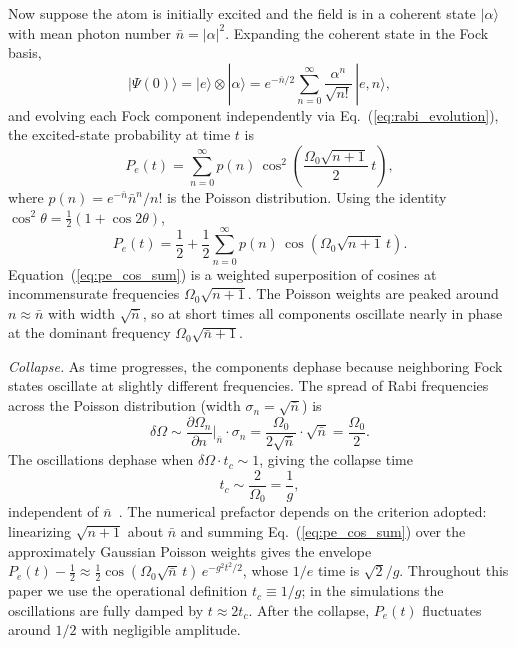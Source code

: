 \documentclass{iopjournal}
\begin{document}
Now suppose the atom is initially excited and the field is in a coherent state $|\alpha\rangle$ with mean photon number $\bar{n} = |\alpha|^2$. Expanding the coherent state in the Fock basis,
\begin{equation}
|\Psi(0)\rangle = |e\rangle \otimes |\alpha\rangle = e^{-\bar{n}/2}\sum_{n=0}^{\infty} \frac{\alpha^n}{\sqrt{n!}}\,|e, n\rangle,
\end{equation}
and evolving each Fock component independently via Eq.~(\ref{eq:rabi_evolution}), the excited-state probability at time $t$ is
\begin{equation}
P_e(t) = \sum_{n=0}^{\infty} p(n)\,\cos^2\!\left(\frac{\Omega_0\sqrt{n+1}}{2}\,t\right),
\label{eq:pe_coherent}
\end{equation}
where $p(n) = e^{-\bar{n}}\bar{n}^n/n!$ is the Poisson distribution. Using the identity $\cos^2\theta = \tfrac{1}{2}(1 + \cos 2\theta)$,
\begin{equation}
P_e(t) = \frac{1}{2} + \frac{1}{2}\sum_{n=0}^{\infty} p(n)\,\cos\!\left(\Omega_0\sqrt{n+1}\,t\right).
\label{eq:pe_cos_sum}
\end{equation}
Equation~(\ref{eq:pe_cos_sum}) is a weighted superposition of cosines at incommensurate frequencies $\Omega_0\sqrt{n+1}$. The Poisson weights are peaked around $n \approx \bar{n}$ with width $\sqrt{\bar{n}}$, so at short times all components oscillate nearly in phase at the dominant frequency $\Omega_0\sqrt{\bar{n}+1}$.

\textit{Collapse.} As time progresses, the components dephase because neighboring Fock states oscillate at slightly different frequencies. The spread of Rabi frequencies across the Poisson distribution (width $\sigma_n = \sqrt{\bar{n}}$) is
\begin{equation}
\delta\Omega \sim \frac{\partial\Omega_n}{\partial n}\bigg|_{\bar{n}} \cdot \sigma_n = \frac{\Omega_0}{2\sqrt{\bar{n}}} \cdot \sqrt{\bar{n}} = \frac{\Omega_0}{2}.
\end{equation}
The oscillations dephase when $\delta\Omega \cdot t_c \sim 1$, giving the collapse time
\begin{equation}
t_c \sim \frac{2}{\Omega_0} = \frac{1}{g},
\label{eq:t_collapse}
\end{equation}
independent of $\bar{n}$~\cite{eberly1980}. The numerical prefactor depends on the criterion adopted: linearizing $\sqrt{n+1}$ about $\bar{n}$ and summing Eq.~(\ref{eq:pe_cos_sum}) over the approximately Gaussian Poisson weights gives the envelope $P_e(t) - \tfrac{1}{2} \approx \tfrac{1}{2}\cos(\Omega_0\sqrt{\bar{n}}\,t)\,e^{-g^2t^2/2}$, whose $1/e$ time is $\sqrt{2}/g$. Throughout this paper we use the operational definition $t_c \equiv 1/g$; in the simulations the oscillations are fully damped by $t \approx 2t_c$. After the collapse, $P_e(t)$ fluctuates around $1/2$ with negligible amplitude.
\end{document}
